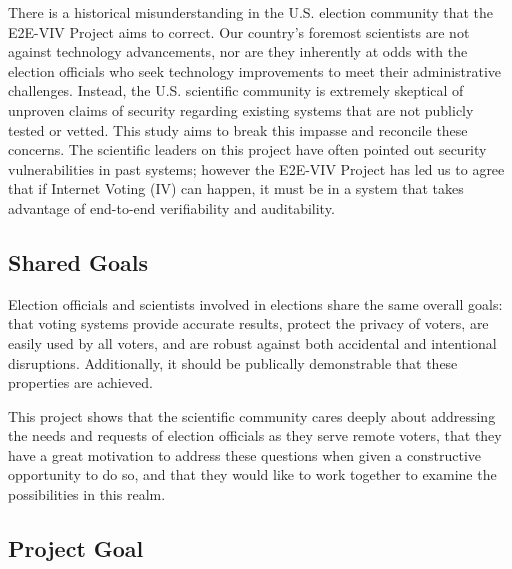 There is a historical misunderstanding in the U.S. election community
that the E2E-VIV Project aims to correct. Our country's foremost
scientists are not against technology advancements, nor are they
inherently at odds with the election officials who seek technology
improvements to meet their administrative challenges. Instead, the
U.S. scientific community is extremely skeptical of unproven claims of
security regarding existing systems that are not publicly tested or
vetted. This study aims to break this impasse and reconcile these
concerns. The scientific leaders on this project have often pointed out
security vulnerabilities in past systems; however the E2E-VIV Project
has led us to agree that if Internet Voting (IV) can happen, it must
be in a system that takes advantage of end-to-end verifiability and
auditability.


\subsection{Shared Goals}
\label{sec:shared-goals}

Election officials and scientists involved in elections share the same
overall goals: that voting systems provide accurate results, protect
the privacy of voters, are easily used by all voters, and are robust
against both accidental and intentional disruptions. Additionally, it
should be publically demonstrable that these properties are achieved.

This project shows that the scientific community cares deeply about
addressing the needs and requests of election officials as they serve
remote voters, that they have a great motivation to address these
questions when given a constructive opportunity to do so, and that
they would like to work together to examine the possibilities in this
realm.

\subsection{Project Goal}
\label{sec:project-goal}

